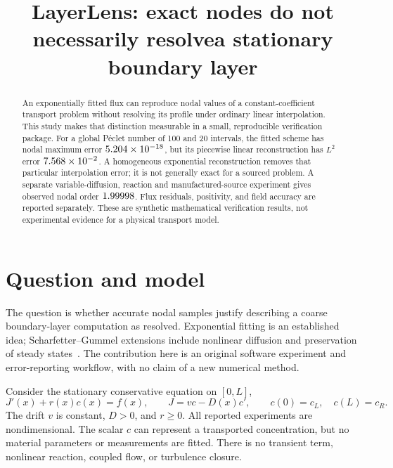 \documentclass[11pt,a4paper]{article}
\title{LayerLens: exact nodes do not necessarily resolve\newline a stationary boundary layer}
\author{}
\date{}
\begin{document}
\maketitle
\vspace{-13mm}
\begin{abstract}
An exponentially fitted flux can reproduce nodal values of a constant-coefficient
transport problem without resolving its profile under ordinary linear interpolation.
This study makes that distinction measurable in a small, reproducible verification
package. For a global P\'eclet number of 100 and 20 intervals, the fitted scheme
has nodal maximum error $5.204\times10^{-18}$, but its piecewise linear reconstruction has
$L^2$ error $7.568\times10^{-2}$. A homogeneous exponential reconstruction removes that
particular interpolation error; it is not generally exact for a sourced problem.
A separate variable-diffusion, reaction and manufactured-source experiment gives
observed nodal order $1.99998$. Flux residuals, positivity, and field accuracy are
reported separately. These are synthetic mathematical verification results, not
experimental evidence for a physical transport model.
\end{abstract}

\section{Question and model}
The question is whether accurate nodal samples justify describing a coarse
boundary-layer computation as resolved. Exponential fitting is an established
idea; Scharfetter--Gummel extensions include nonlinear diffusion and preservation
of steady states~\cite{bessemoulin}. The contribution here is an original software
experiment and error-reporting workflow, with no claim of a new numerical method.

Consider the stationary conservative equation on $[0,L]$,
\begin{equation}
 J'(x)+r(x)c(x)=f(x),\qquad J=vc-D(x)c',\qquad
 c(0)=c_L,\quad c(L)=c_R. \label{eq:model}
\end{equation}
The drift $v$ is constant, $D>0$, and $r\geq0$. All reported experiments are
nondimensional. The scalar $c$ can represent a transported concentration, but no
material parameters or measurements are fitted. There is no transient term,
nonlinear reaction, coupled flow, or turbulence closure.
\end{document}
